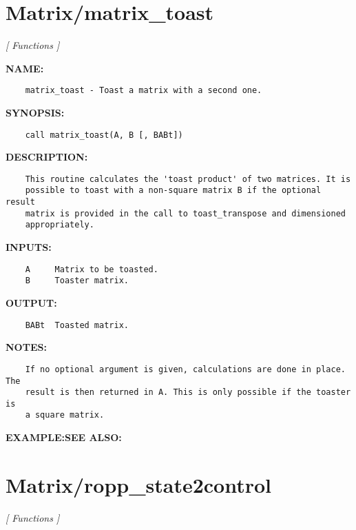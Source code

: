 \section{Matrix/matrix\_toast}
\textsl{[ Functions ]}

\label{ch:robo33}
\label{ch:Matrix_matrix_toast}
\textbf{NAME:}\hspace{0.08in}\begin{Verbatim}
    matrix_toast - Toast a matrix with a second one.
\end{Verbatim}
\textbf{SYNOPSIS:}\hspace{0.08in}\begin{Verbatim}
    call matrix_toast(A, B [, BABt])
\end{Verbatim}
\textbf{DESCRIPTION:}\hspace{0.08in}\begin{Verbatim}
    This routine calculates the 'toast product' of two matrices. It is
    possible to toast with a non-square matrix B if the optional result
    matrix is provided in the call to toast_transpose and dimensioned
    appropriately.
\end{Verbatim}
\textbf{INPUTS:}\hspace{0.08in}\begin{Verbatim}
    A     Matrix to be toasted.
    B     Toaster matrix.
\end{Verbatim}
\textbf{OUTPUT:}\hspace{0.08in}\begin{Verbatim}
    BABt  Toasted matrix.
\end{Verbatim}
\textbf{NOTES:}\hspace{0.08in}\begin{Verbatim}
    If no optional argument is given, calculations are done in place. The
    result is then returned in A. This is only possible if the toaster is
    a square matrix.
\end{Verbatim}
\textbf{EXAMPLE:}\hspace{0.08in}\textbf{SEE ALSO:}\hspace{0.08in}\section{Matrix/ropp\_state2control}
\textsl{[ Functions ]}

